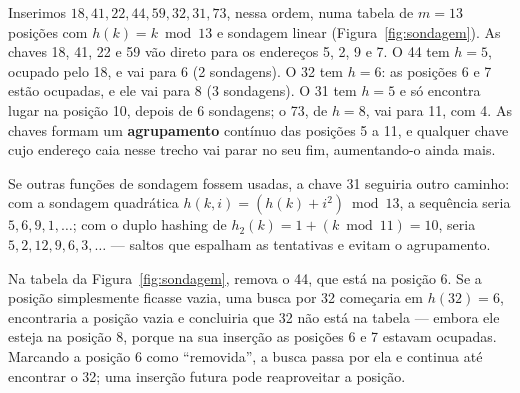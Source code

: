 \begin{exemplo}\label{ex:linear}
Inserimos $18,41,22,44,59,32,31,73$, nessa ordem, numa tabela de $m=13$ posições com $h(k)=k\bmod13$ e sondagem linear (Figura~\ref{fig:sondagem}). As chaves 18, 41, 22 e 59 vão direto para os endereços 5, 2, 9 e 7. O 44 tem $h=5$, ocupado pelo 18, e vai para 6 (2 sondagens). O 32 tem $h=6$: as posições 6 e 7 estão ocupadas, e ele vai para 8 (3 sondagens). O 31 tem $h=5$ e só encontra lugar na posição 10, depois de 6 sondagens; o 73, de $h=8$, vai para 11, com 4. As chaves formam um \textbf{agrupamento} contínuo das posições 5 a 11, e qualquer chave cujo endereço caia nesse trecho vai parar no seu fim, aumentando-o ainda mais.

Se outras funções de sondagem fossem usadas, a chave 31 seguiria outro caminho: com a sondagem quadrática $h(k,i)=(h(k)+i^2)\bmod13$, a sequência seria $5,6,9,1,\dots$; com o duplo hashing de $h_2(k)=1+(k\bmod11)=10$, seria $5,2,12,9,6,3,\dots$ --- saltos que espalham as tentativas e evitam o agrupamento.
\begin{figura}[Sondagem linear com $m=13$ depois das oito inserções do Exemplo~\ref{ex:linear}. O número abaixo de cada chave é a quantidade de sondagens que a sua inserção fez; as posições 5 a 11 formam um agrupamento.\label{fig:sondagem}]
\end{figura}
\end{exemplo}

\begin{exemplo}\label{ex:hashrem}
Na tabela da Figura~\ref{fig:sondagem}, remova o 44, que está na posição 6. Se a posição simplesmente ficasse vazia, uma busca por 32 começaria em $h(32)=6$, encontraria a posição vazia e concluiria que 32 não está na tabela --- embora ele esteja na posição 8, porque na sua inserção as posições 6 e 7 estavam ocupadas. Marcando a posição 6 como ``removida'', a busca passa por ela e continua até encontrar o 32; uma inserção futura pode reaproveitar a posição.
\end{exemplo}

